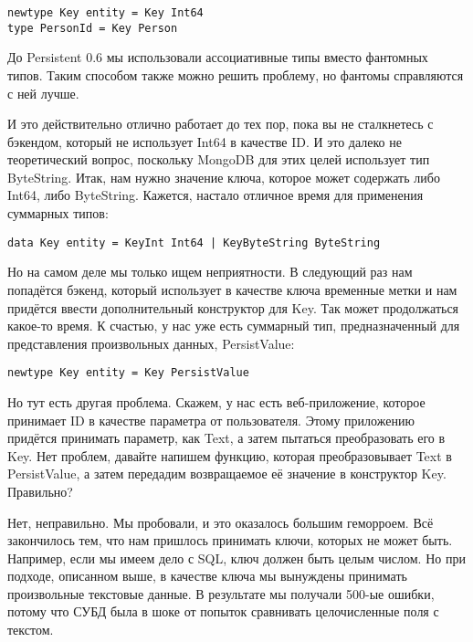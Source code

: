 \begin{lstlisting}
newtype Key entity = Key Int64
type PersonId = Key Person
\end{lstlisting}

\begin{remark}
До Persistent 0.6 мы использовали ассоциативные типы вместо фантомных типов. Таким способом также можно решить проблему, но фантомы справляются с ней лучше.
\end{remark}

И это действительно отлично работает до тех пор, пока вы не сталкнетесь с бэкендом, который не использует Int64 в качестве ID. И это далеко не теоретический вопрос, поскольку MongoDB для этих целей использует тип ByteString. Итак, нам нужно значение ключа, которое может содержать либо Int64, либо ByteString. Кажется, настало отличное время для применения суммарных типов:

\begin{lstlisting}
data Key entity = KeyInt Int64 | KeyByteString ByteString
\end{lstlisting}

Но на самом деле мы только ищем неприятности. В следующий раз нам попадётся бэкенд, который использует в качестве ключа временные метки и нам придётся ввести дополнительный конструктор для Key. Так может продолжаться какое-то время. К счастью, у нас уже есть суммарный тип, предназначенный для представления произвольных данных, PersistValue:

\begin{lstlisting}
newtype Key entity = Key PersistValue
\end{lstlisting}

Но тут есть другая проблема. Скажем, у нас есть веб-приложение, которое принимает ID в качестве параметра от пользователя. Этому приложению придётся принимать параметр, как Text, а затем пытаться преобразовать его в Key. Нет проблем, давайте напишем функцию, которая преобразовывает Text в PersistValue, а затем передадим возвращаемое её значение в конструктор Key. Правильно?

Нет, неправильно. Мы пробовали, и это оказалось большим геморроем. Всё закончилось тем, что нам пришлось принимать ключи, которых не может быть. Например, если мы имеем дело с SQL, ключ должен быть целым числом. Но при подходе, описанном выше, в качестве ключа мы вынуждены принимать произвольные текстовые данные. В результате мы получали 500-ые ошибки, потому что СУБД была в шоке от попыток сравнивать целочисленные поля с текстом.

